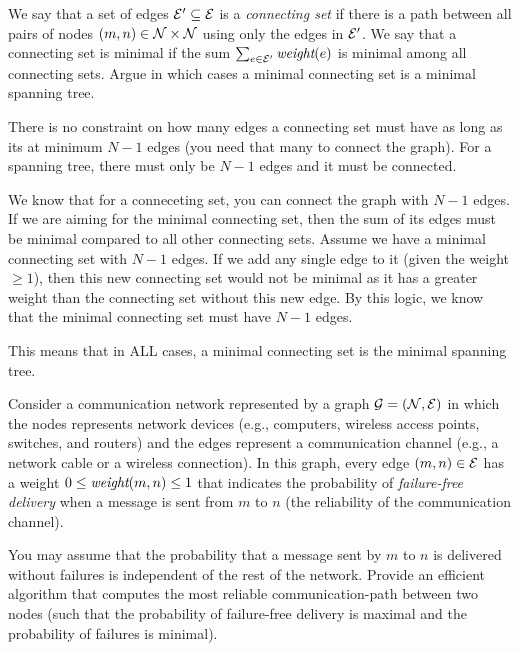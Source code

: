 \begin{problem}
\begin{questions}
\item We say that a set of edges $\mathcal{E}' \subseteq \mathcal{E}$ is a \emph{connecting set} if there is a path between all pairs of nodes $(m, n) \in \mathcal{N}\times\mathcal{N}$ using only the edges in $\mathcal{E}'$. We say that a connecting set is minimal if the sum $\sum_{e \in \mathcal{E}'} \mathord{\textit{weight}}(e)$ is minimal among all connecting sets. Argue in which cases a minimal connecting set is a minimal spanning tree.

There is no constraint on how many edges a connecting set must have as long as its at minimum $N-1$ edges (you need that many to connect the graph).
For a spanning tree, there must only be $N-1$ edges and it must be connected.

We know that for a conneceting set, you can connect the graph with $N-1$ edges. If we are aiming for the minimal connecting set, then the sum of its edges must be minimal compared to all other connecting sets. 
Assume we have a minimal connecting set with $N-1$ edges. If we add any single edge to it (given the weight $\geq 1$), then this new connecting set would not be minimal as it has a greater weight than the connecting set without this new edge.
By this logic, we know that the minimal connecting set must have $N-1$ edges.

This means that in ALL cases, a minimal connecting set is the minimal spanning tree.

\end{questions}
\end{problem}

\begin{problem}
Consider a communication network represented by a graph $\mathcal{G} = (\mathcal{N}, \mathcal{E})$ in which the nodes represents network devices (e.g., computers, wireless access points, switches, and routers) and the edges represent a communication channel (e.g., a network cable or a wireless connection). In this graph, every edge $(m, n) \in \mathcal{E}$ has a weight $0\leq\mathord{\textit{weight}}{(m, n)}\leq 1$ that indicates the probability of \emph{failure-free delivery} when a message is sent from $m$ to $n$ (the reliability of the communication channel).

You may assume that the probability that a message sent by $m$ to $n$ is delivered without failures is independent  of the rest of the network. Provide an efficient algorithm that computes the most reliable communication-path between two nodes (such that the probability of failure-free delivery is maximal and the probability of failures is minimal).
\end{problem}

\SUBMITMSG{}
\DEFAULTGRADING{}

